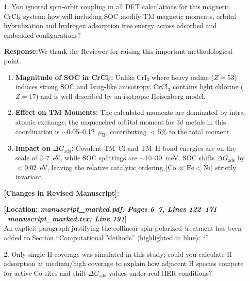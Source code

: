 \documentclass[11pt, sans, a4paper]{moderncv}
\newcommand{\response}{\vspace{0.4em}\noindent\textbf{\color{actionblue}Response:}\hspace{0.5em}}
\newcommand{\manuscriptchange}[1]{{\renewcommand{\label}[1]{}\vspace{0.4em}\noindent\textbf{\color{acsblue}[Changes in Revised Manuscript]:}\par\nopagebreak\vspace{0.15em}#1\vspace{0.4em}}}
\begin{document}
\vspace{1em}

\begin{reviewercomment}
1. You ignored spin-orbit coupling in all DFT calculations for this magnetic $\text{CrCl}_3$ system; how will including SOC modify TM magnetic moments, orbital hybridization and hydrogen adsorption free energy across adsorbed and embedded configurations?
\end{reviewercomment}

\response We thank the Reviewer for raising this important methodological point.
\begin{enumerate}[leftmargin=1.5em, itemsep=0.2em]
\item \textbf{Magnitude of SOC in CrCl$_3$:} Unlike $\text{CrI}_3$ where heavy iodine ($Z=53$) induces strong SOC and Ising-like anisotropy, $\text{CrCl}_3$ contains light chlorine ($Z=17$) and is well described by an isotropic Heisenberg model.
\item \textbf{Effect on TM Moments:} The calculated moments are dominated by intra-atomic exchange; the unquenched orbital moment for $3d$ metals in this coordination is $\sim$0.05--0.12~$\mu_{\mathrm{B}}$, contributing $<$5\% to the total moment.
\item \textbf{Impact on $\Delta G_{\mathrm{ads}}$:} Covalent TM--Cl and TM--H bond energies are on the scale of 2--7~eV, while SOC splittings are $\sim$10--30~meV. SOC shifts $\Delta G_{\mathrm{ads}}$ by $<$0.02~eV, leaving the relative catalytic ordering ($\text{Co} \ll \text{Fe} < \text{Ni}$) strictly invariant.
\end{enumerate}

\manuscriptchange{\textbf{[Location: \textit{manuscript\_marked.pdf: Pages 6--7, Lines 122--171} \textbar\ \textit{manuscript\_marked.tex: Line 191}]}\\ An explicit paragraph justifying the collinear spin-polarized treatment has been added to Section ``Computational Methods'' (highlighted in blue): ``{\itshape \ExecuteMetaData[manuscript_marked.tex]{SOCStatement}}''}

\vspace{0.8em}

\begin{reviewercomment}
2. Only single H coverage was simulated in this study; could you calculate H adsorption at medium/high coverage to explain how adjacent H species compete for active Co sites and shift $\Delta G_{\mathrm{ads}}$ values under real HER conditions?
\end{reviewercomment}
\end{document}
